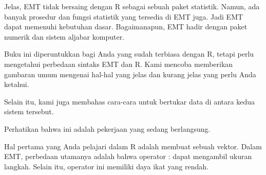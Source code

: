 \documentclass[a4paper,10pt]{article}
\begin{document}
\begin{eulernotebook}
\begin{eulercomment}
\begin{eulercomment}
\begin{eulercomment}
\begin{eulercomment}
\begin{eulercomment}
\begin{eulercomment}
\begin{eulercomment}
\begin{eulercomment}
\begin{eulercomment}
\begin{eulercomment}
\begin{eulercomment}
\begin{eulercomment}
\begin{eulercomment}
\begin{eulercomment}
\begin{eulercomment}
\begin{eulercomment}
\begin{eulercomment}
\begin{eulercomment}
\begin{eulercomment}
\begin{eulercomment}
\begin{eulercomment}
\begin{eulercomment}
\begin{eulercomment}
\begin{eulercomment}
\begin{eulercomment}
\begin{eulercomment}
\begin{eulercomment}
\begin{eulercomment}
\begin{eulercomment}
\begin{eulercomment}
\begin{eulercomment}
\begin{eulercomment}
\begin{eulercomment}
\begin{eulercomment}
\begin{eulercomment}
\begin{eulercomment}
\begin{eulercomment}
\begin{eulercomment}
\begin{eulercomment}
\begin{eulercomment}
\begin{eulercomment}
\begin{eulercomment}
\begin{eulercomment}
\begin{eulercomment}
\begin{eulercomment}
\begin{eulercomment}
\begin{eulercomment}
\begin{eulercomment}
\begin{eulercomment}
Jelas, EMT tidak bersaing dengan R sebagai sebuah paket statistik.
Namun, ada banyak prosedur dan fungsi statistik yang tersedia di EMT
juga. Jadi EMT dapat memenuhi kebutuhan dasar. Bagaimanapun, EMT hadir
dengan paket numerik dan sistem aljabar komputer.

Buku ini diperuntukkan bagi Anda yang sudah terbiasa dengan R, tetapi
perlu mengetahui perbedaan sintaks EMT dan R. Kami mencoba memberikan
gambaran umum mengenai hal-hal yang jelas dan kurang jelas yang perlu
Anda ketahui.

Selain itu, kami juga membahas cara-cara untuk bertukar data di antara
kedua sistem tersebut.
\end{eulercomment}
\begin{eulercomment}
Perhatikan bahwa ini adalah pekerjaan yang sedang berlangsung.
\end{eulercomment}
\begin{eulercomment}
Hal pertama yang Anda pelajari dalam R adalah membuat sebuah vektor.
Dalam EMT, perbedaan utamanya adalah bahwa operator : dapat mengambil
ukuran langkah. Selain itu, operator ini memiliki daya ikat yang
rendah.
\end{eulercomment}

\end{eulercomment}
\end{eulercomment}
\end{eulercomment}
\end{eulercomment}
\end{eulercomment}
\end{eulercomment}
\end{eulercomment}
\end{eulercomment}
\end{eulercomment}
\end{eulercomment}
\end{eulercomment}
\end{eulercomment}
\end{eulercomment}
\end{eulercomment}
\end{eulercomment}
\end{eulercomment}
\end{eulercomment}
\end{eulercomment}
\end{eulercomment}
\end{eulercomment}
\end{eulercomment}
\end{eulercomment}
\end{eulercomment}
\end{eulercomment}
\end{eulercomment}
\end{eulercomment}
\end{eulercomment}
\end{eulercomment}
\end{eulercomment}
\end{eulercomment}
\end{eulercomment}
\end{eulercomment}
\end{eulercomment}
\end{eulercomment}
\end{eulercomment}
\end{eulercomment}
\end{eulercomment}
\end{eulercomment}
\end{eulercomment}
\end{eulercomment}
\end{eulercomment}
\end{eulercomment}
\end{eulercomment}
\end{eulercomment}
\end{eulercomment}
\end{eulercomment}
\end{eulercomment}
\end{eulercomment}
\end{eulernotebook}
\end{document}
